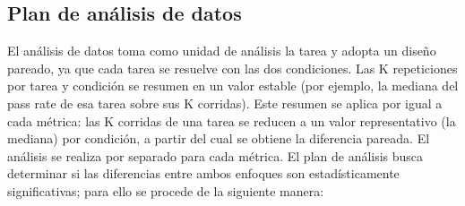 \subsection{Plan de análisis de datos}
El análisis de datos toma como unidad de análisis la tarea y adopta un diseño pareado, ya que cada tarea se resuelve con las dos condiciones. Las K repeticiones por tarea y condición se resumen en un valor estable (por ejemplo, la mediana del pass rate de esa tarea sobre sus K corridas). Este resumen se aplica por igual a cada métrica: las K corridas de una tarea se reducen a un valor representativo (la mediana) por condición, a partir del cual se obtiene la diferencia pareada.
El análisis se realiza por separado para cada métrica. El plan de análisis busca determinar si las diferencias entre ambos enfoques son estadísticamente significativas; para ello se procede de la siguiente manera:
